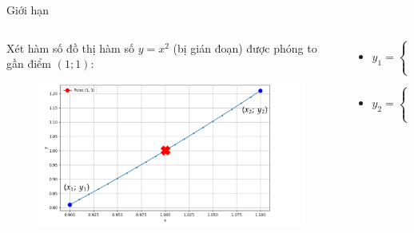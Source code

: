\begin{frame}{Giới hạn}
    \begin{columns}
        \begin{column}{0.5\textwidth}
            Xét hàm số đồ thị hàm số \(y=x^2\) (bị gián đoạn) được phóng to gần điểm \((1; 1)\):
            \begin{figure}
            \centering
            \includegraphics[width=1\textwidth]{Slides/figure/0.9-1.1 (drama).png}
            \end{figure}
        \end{column}
        \begin{column}{0.5\textwidth}
            \begin{itemize}
                \item \(y_1 = 
                \begin{cases}
                    x_1^2 & \text{nếu } x_1 \neq 1 \\
                    -100 & \text{nếu } x_1 = 1
                \end{cases}
            \)
            \item \(y_2 = 
                \begin{cases}
                    x_2^2 & \text{nếu } x_2 \neq 1 \\
                    100 & \text{nếu } x_2 = 1
                \end{cases}
            \)
            \end{itemize}
        \end{column}
    \end{columns}
\end{frame}
\newpage
